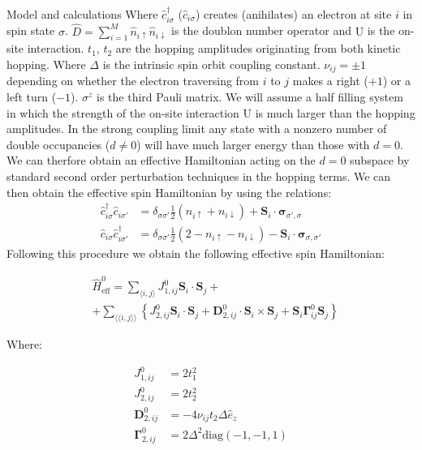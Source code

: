 \documentclass[aps,prl,twocolumn,amsmath,amssymb,superscriptaddress,nobibnotes]{revtex4}%
\newcommand{\n}{\nonumber}
\newcommand{\bs}{\boldsymbol}
\begin{document}
\begin{section}{Model and calculations}
Where $\hat{c}_{i \sigma}^\dagger$ ($ \hat{c}_{i \sigma}$) creates (anihilates) an electron at site $i$ in spin state $\sigma$. $\hat{D} = \sum_{i=1}^M \hat{n}_{i\uparrow}\hat{n}_{i\downarrow}$ is the doublon number operator and $\text{U}$ is the on-site interaction. $t_1$, $t_2$ are the hopping amplitudes originating from both kinetic hopping. Where $\Delta$ is the intrinsic spin orbit coupling constant. $\nu_{ij}=\pm 1$ depending on whether the electron traversing from $i$ to $j$ makes a right ($+1$) or a left turn ($-1$). $\sigma^{z}$ is the third Pauli matrix. We will assume a half filling system in which the strength of the on-site interaction $\text{U}$ is much larger than the hopping amplitudes. In the strong coupling limit any state with a nonzero number of double occupancies ($d \neq 0$) will have much larger energy than those with $d=0$. We can therfore obtain an effective Hamiltonian acting on the $d=0$ subspace by standard second order perturbation techniques in the hopping terms. We can then obtain the effective spin Hamiltonian by using the relations:
\begin{align}
\hat{c}_{i \sigma}^\dagger \hat{c}_{i \sigma'} &= \delta_{\sigma \sigma'} \frac{1}{2} (n_{i \uparrow} + n_{i \downarrow}) + \bs{S}_i\cdot\bs{\sigma}_{\sigma', \sigma} \label{SpinOperatorInv1}\\ 
\hat{c}_{i \sigma} \hat{c}_{i \sigma'}^\dagger &= \delta_{\sigma \sigma'} \frac{1}{2} (2 - n_{i \uparrow} - n_{i \downarrow}) - \bs{S}_i\cdot\bs{\sigma}_{\sigma, \sigma'} \label{SpinOperatorInv2}
\end{align}
Following this procedure we obtain the following effective spin Hamiltonian:

\begin{align}
\label{MKMHeff0}
&\hat{H}_{\text{eff}}^0 = \sum_{\langle i,j \rangle} J_{1,ij}^0\bs{S}_i\cdot\bs{S}_j +\n \\
&+ \sum_{\langle \langle i,j \rangle \rangle} \left\{ J_{2,ij}^0\bs{S}_i\cdot\bs{S}_j + \bs{D}_{2,ij}^0\cdot \bs{S}_i \times \bs{S}_j + \bs{S}_i \bs{\Gamma}_{ij}^0 \bs{S}_j \right\}
\end{align}

Where:

\begin{align*}
J_{1,ij}^0 &= 2t_1^2 \\
J_{2,ij}^0 &= 2t_2^2 \\
\bs{D}_{2,ij}^0 &= - 4\nu_{ij} t_2 \Delta \hat{e}_z \\
\bs{\Gamma}_{2,ij}^0 &= 2\Delta^2 \text{diag}(-1,-1,1)
\end{align*}


\end{section}
\end{document}
